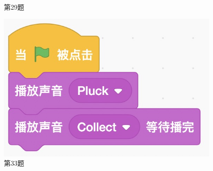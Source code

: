 \documentclass[10pt, a4paper]{article}
\begin{document}
\begin{enumerate}
\begin{figure}[htbp]
\begin{minipage}[t]{.33\textwidth}
                \caption*{第29题}
            \end{minipage}
            \begin{minipage}[t]{.28\textwidth}
                \centering
                \includegraphics[width=\textwidth]{33.jpg}
                \caption*{第33题}
            \end{minipage}
        \end{figure}
    \end{enumerate}
\end{document}
